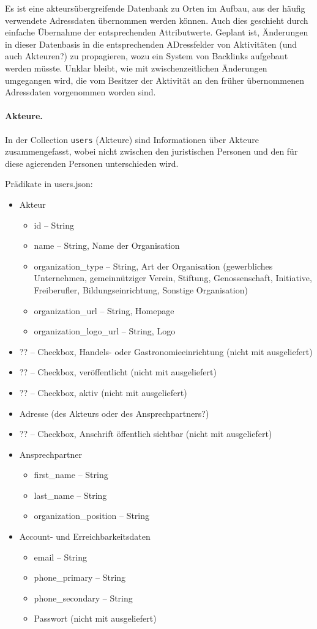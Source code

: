 \documentclass[a4paper,11pt]{article}
\begin{document}
Es ist eine akteursübergreifende Datenbank zu Orten im Aufbau, aus der häufig
verwendete Adressdaten übernommen werden können.  Auch dies geschieht durch
einfache Übernahme der entsprechenden Attributwerte. Geplant ist, Änderungen
in dieser Datenbasis in die entsprechenden ADressfelder von Aktivitäten (und
auch Akteuren?) zu propagieren, wozu ein System von Backlinks aufgebaut werden
müsste. Unklar bleibt, wie mit zwischenzeitlichen Änderungen umgegangen wird,
die vom Besitzer der Aktivität an den früher übernommenen Adressdaten
vorgenommen worden sind.

\paragraph{Akteure.}
In der Collection \texttt{users} (Akteure) sind Informationen über Akteure
zusammengefasst, wobei nicht zwischen den juristischen Personen und den für
diese agierenden Personen unterschieden wird. 

Prädikate in users.json:
\begin{itemize}\itemsep0pt
\item Akteur
\begin{itemize}\itemsep0pt
  \item id -- String
  \item name -- String, Name der Organisation
  \item organization\_type -- String, Art der Organisation (gewerbliches
    Unternehmen, gemeinnütziger Verein, Stiftung, Genossenschaft, Initiative,
    Freiberufler, Bildungseinrichtung, Sonstige Organisation)
  \item organization\_url -- String, Homepage
  \item organization\_logo\_url -- String, Logo
\end{itemize}
\item ?? -- Checkbox, Handels- oder Gastronomieeinrichtung (nicht mit
  ausgeliefert)
\item ?? -- Checkbox, veröffentlicht (nicht mit ausgeliefert)
\item ?? -- Checkbox, aktiv (nicht mit ausgeliefert)
\item Adresse (des Akteurs oder des Ansprechpartners?)
\item ?? -- Checkbox, Anschrift öffentlich sichtbar (nicht mit ausgeliefert)
\item Ansprechpartner
\begin{itemize}\itemsep0pt
  \item first\_name -- String
  \item last\_name -- String
  \item organization\_position -- String
\end{itemize}
\item Account- und Erreichbarkeitsdaten
\begin{itemize}\itemsep0pt
  \item email -- String
  \item phone\_primary -- String
  \item phone\_secondary -- String
  \item Passwort (nicht mit ausgeliefert)
\end{itemize}
\end{itemize}
\end{document}
